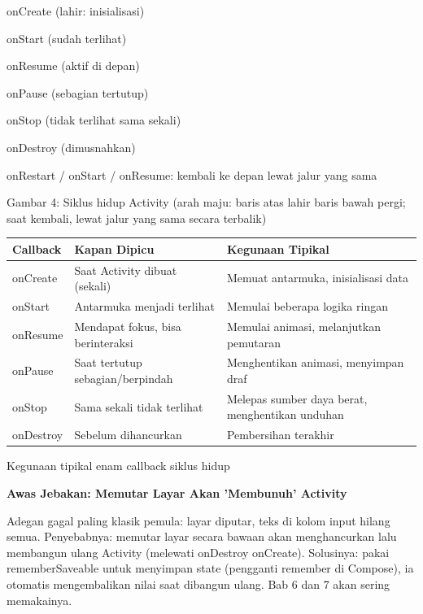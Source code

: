 onCreate (lahir: inisialisasi)

onStart (sudah terlihat)

onResume (aktif di depan)

onPause (sebagian tertutup)

onStop (tidak terlihat sama sekali)

onDestroy (dimusnahkan)

onRestart / onStart / onResume: kembali ke depan lewat jalur yang sama

\begin{center}\small\color{gray}Gambar 4: Siklus hidup Activity (arah maju: baris atas lahir baris bawah pergi; saat kembali, lewat jalur yang sama secara terbalik)\end{center}

\begin{center}
\begin{tabularx}{\linewidth}{|X|X|X|}
\hline
\textbf{Callback} & \textbf{Kapan Dipicu} & \textbf{Kegunaan Tipikal} \tabularnewline
\hline
onCreate & Saat Activity dibuat (sekali) & Memuat antarmuka, inisialisasi data \tabularnewline
onStart & Antarmuka menjadi terlihat & Memulai beberapa logika ringan \tabularnewline
onResume & Mendapat fokus, bisa berinteraksi & Memulai animasi, melanjutkan pemutaran \tabularnewline
onPause & Saat tertutup sebagian/berpindah & Menghentikan animasi, menyimpan draf \tabularnewline
onStop & Sama sekali tidak terlihat & Melepas sumber daya berat, menghentikan unduhan \tabularnewline
onDestroy & Sebelum dihancurkan & Pembersihan terakhir \tabularnewline
\hline
\end{tabularx}
\end{center}

\begin{center}\small\color{gray}Kegunaan tipikal enam callback siklus hidup\end{center}

\textbf{Awas Jebakan: Memutar Layar Akan 'Membunuh' Activity}\par

Adegan gagal paling klasik pemula: layar diputar, teks di kolom input hilang semua. Penyebabnya: memutar layar secara bawaan akan menghancurkan lalu membangun ulang Activity (melewati onDestroy onCreate). Solusinya: pakai rememberSaveable untuk menyimpan state (pengganti remember di Compose), ia otomatis mengembalikan nilai saat dibangun ulang. Bab 6 dan 7 akan sering memakainya.


